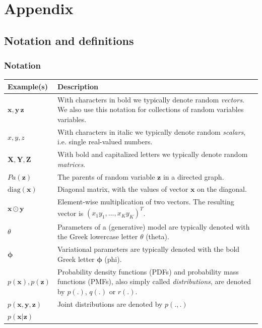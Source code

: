 \documentclass[MAL,biber]{nowfnt} %
\newcommand{\bb}[1]{\mathbf{#1}}
\newcommand{\bx}{\bb{x}}
\newcommand{\by}{\bb{y}}
\newcommand{\bz}{\bb{z}}
\newcommand{\bphi}{\boldsymbol{\phi}}
\newcommand{\bX}{\bb{X}}
\newcommand{\bY}{\bb{Y}}
\newcommand{\bZ}{\bb{Z}}
\begin{document}
\appendix

\chapter{Appendix}
\label{chap:appendix}

\section{Notation and definitions}\label{sec:notdef}

\subsection{Notation}
\bgroup
\def\arraystretch{1.5}%
\begin{longtable}{| p{2.5cm} | p{8cm} |}
	\hline 
	\textbf{Example(s)} & \textbf{Description} \\
	\hline \hline
	$\bx,\by\,\bz$
	&
	With characters in bold we typically denote random \emph{vectors}. We also use this notation for collections of random variables variables.
	\\ \hline
	$x,y,z$
	&
	With characters in italic we typically denote random \emph{scalars}, i.e. single real-valued numbers.
	\\ \hline
	$\bX,\bY,\bZ$
	&
	With bold and capitalized letters we typically denote random \emph{matrices}.
	\\ \hline
	$Pa(\bz)$
	&
	The parents of random variable $\bz$ in a directed graph.
	\\ \hline
	$\text{diag}(\bx)$
	&
	Diagonal matrix, with the values of vector $\bx$ on the diagonal.
	\\ \hline
	$\bx \odot \by$
	&
	Element-wise multiplication of two vectors. The resulting vector is $(x_1\allowbreak y_1, ..., x_K y_K)^T$.
	\\ \hline
	$\theta$
	&
	Parameters of a (generative) model are typically denoted with the Greek lowercase letter $\theta$ (theta).
	\\ \hline
	$\bphi$
	&
	Variational parameters are typically denoted with the bold Greek letter $\bphi$ (phi).
	\\ \hline
	$p(\bx), p(\bz)$
	&
	Probability density functions (PDFs) and probability mass functions (PMFs), also simply called \emph{distributions}, are denoted by $p(.)$, $q(.)$ or $r(.)$.
	\\ \hline
	$p(\bx,\by,\bz)$
	&
	Joint distributions are denoted by $p(.,.)$
	\\ \hline
	$p(\bx|\bz)$

\end{longtable}
\end{document}
